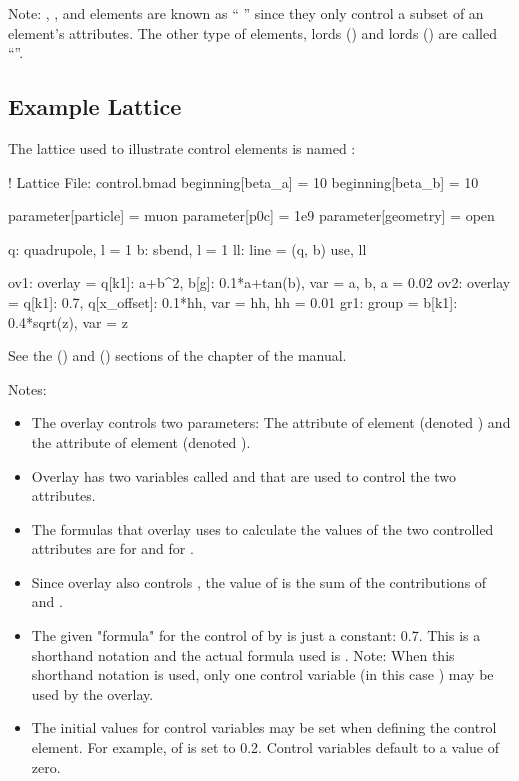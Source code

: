 \documentclass{hitec}     %
\begin{document}
Note: , , and  elements are known as `` '' since they
only control a subset of an element's attributes. The other type of  elements,  lords
() and  lords () are called ``''.

\subsection{Example Lattice}

The lattice used to illustrate control elements is named :
\begin{code}
! Lattice File: control.bmad
beginning[beta_a] = 10
beginning[beta_b] = 10

parameter[particle] = muon
parameter[p0c] = 1e9
parameter[geometry] = open

q: quadrupole, l = 1
b: sbend, l = 1
ll: line = (q, b)
use, ll

ov1: overlay = {q[k1]: a+b^2, b[g]: 0.1*a+tan(b)}, var = {a, b}, a = 0.02
ov2: overlay = {q[k1]: 0.7, q[x_offset]: 0.1*hh}, var = {hh}, hh = 0.01
gr1: group = {b[k1]: 0.4*sqrt(z)}, var = {z}
\end{code}
See the  () and  () sections of the
 chapter of the \bmad manual.

Notes:
\vspace{-5 pt}
\begin{itemize}
\item
The overlay  controls two parameters: 
The  attribute of element  (denoted ) and the  attribute of element
 (denoted ).
\item
Overlay  has two variables called  and  that are used to control the two attributes.
\item
The formulas that overlay  uses to calculate the values of the two controlled
attributes are  for  and  for .
\item 
Since overlay  also controls , the value of  is the sum of the
contributions of  and .
\item
The given "formula" for the control of  by  is just a constant: 0.7.  This is a
shorthand notation and the actual formula used is .  Note: When this shorthand notation
is used, only one control variable (in this case ) may be used by the overlay.
\item
The initial values for control variables may be set when defining the control element. For example,
 of  is set to 0.2. Control variables default to a value of zero.
\end{itemize}
\end{document}
